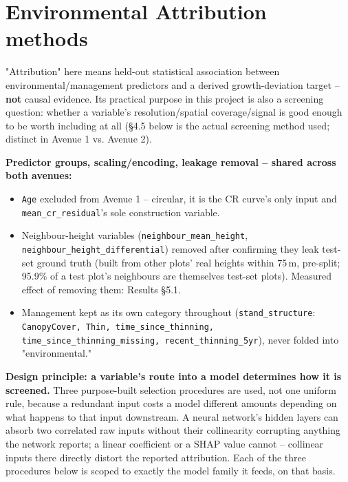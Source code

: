 \documentclass[11pt,a4paper]{report}
\begin{document}
\section{Environmental Attribution methods}

"Attribution" here means held-out statistical association between environmental/management
predictors and a derived growth-deviation target -- \textbf{not} causal evidence. Its practical
purpose in this project is also a screening question: whether a variable's resolution/spatial
coverage/signal is good enough to be worth including at all (\S4.5 below is the actual screening
method used; distinct in Avenue 1 vs. Avenue 2).

\textbf{Predictor groups, scaling/encoding, leakage removal -- shared across both avenues:}
\begin{itemize}
\setlength\itemsep{0pt}
\item \texttt{Age} excluded from Avenue 1 -- circular, it is the CR curve's only input and
\texttt{mean\_cr\_residual}'s sole construction variable.
\item Neighbour-height variables (\texttt{neighbour\_mean\_height},
\texttt{neighbour\_height\_differential}) removed after confirming they leak test-set ground truth
(built from other plots' real heights within 75\,m, pre-split; 95.9\% of a test plot's neighbours
are themselves test-set plots). Measured effect of removing them: Results \S5.1.
\item Management kept as its own category throughout
(\texttt{stand\_structure}: \texttt{CanopyCover, Thin, time\_since\_thinning,
time\_since\_thinning\_missing, recent\_thinning\_5yr}), never folded into "environmental."
\end{itemize}

\textbf{Design principle: a variable's route into a model determines how it is screened.} Three
purpose-built selection procedures are used, not one uniform rule, because a redundant input
costs a model different amounts depending on what happens to that input downstream. A neural
network's hidden layers can absorb two correlated raw inputs without their collinearity
corrupting anything the network reports; a linear coefficient or a SHAP value cannot -- collinear
inputs there directly distort the reported attribution. Each of the three procedures below is
scoped to exactly the model family it feeds, on that basis.
\end{document}
